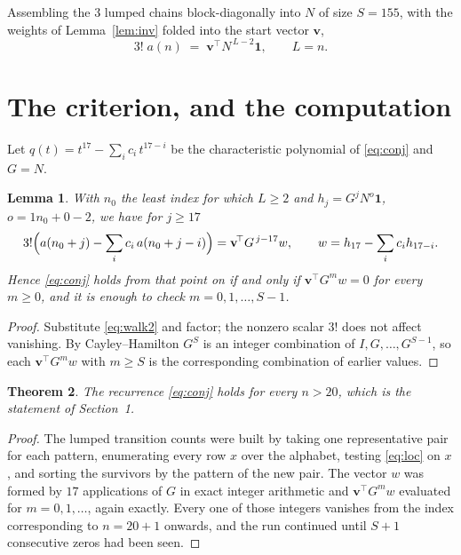 \documentclass[11pt,a4paper]{article}
\theoremstyle{plain}
\newtheorem{theorem}{Theorem}
\newtheorem{lemma}[theorem]{Lemma}
\theoremstyle{definition}
\begin{document}
Assembling the $3$ lumped chains block-diagonally into $N$ of size $S=155$, with the
weights of Lemma~\ref{lem:inv} folded into the start vector $\mathbf{v}$,
\begin{equation}\label{eq:walk2}
3!\;a(n)\;=\;\mathbf{v}^{\!\top}N^{\,L-2}\mathbf{1},\qquad L=n .
\end{equation}

\section{The criterion, and the computation}

Let $q(t)=t^{17}-\sum_i c_i\,t^{17-i}$ be the characteristic polynomial of
\eqref{eq:conj} and $G=N$.

\begin{lemma}\label{lem:crit}
With $n_0$ the least index for which $L\ge2$ and $h_j=G^{j}N^{o}\mathbf{1}$,
$o=1n_0+0-2$, we have for $j\ge17$
\[
3!\Bigl(a(n_0+j)-\sum_i c_i\,a(n_0+j-i)\Bigr)
=\mathbf{v}^{\!\top}G^{\,j-17}w,\qquad
w=h_{17}-\sum_i c_i h_{17-i} .
\]
Hence \eqref{eq:conj} holds from that point on if and only if
$\mathbf{v}^{\!\top}G^{m}w=0$ for every $m\ge0$, and it is enough to check
$m=0,1,\dots,S-1$.
\end{lemma}

\begin{proof}
Substitute \eqref{eq:walk2} and factor; the nonzero scalar $3!$ does not affect
vanishing. By Cayley--Hamilton $G^{S}$ is an integer combination of $I,G,\dots,G^{S-1}$,
so each $\mathbf{v}^{\!\top}G^{m}w$ with $m\ge S$ is the corresponding combination of
earlier values.
\end{proof}

\begin{theorem}
The recurrence \eqref{eq:conj} holds for every $n>20$, which is the statement of
Section~1.
\end{theorem}

\begin{proof}
The lumped transition counts were built by taking one representative pair for each pattern,
enumerating every row $x$ over the alphabet, testing \eqref{eq:loc} on $x$, and sorting
the survivors by the pattern of the new pair. The vector $w$ was formed by $17$
applications of $G$ in exact integer arithmetic and $\mathbf{v}^{\!\top}G^{m}w$
evaluated for $m=0,1,\dots$, again exactly. Every one of those integers vanishes from the
index corresponding to $n=20+1$ onwards, and the run continued until $S+1$ consecutive
zeros had been seen.
\end{proof}
\end{document}
